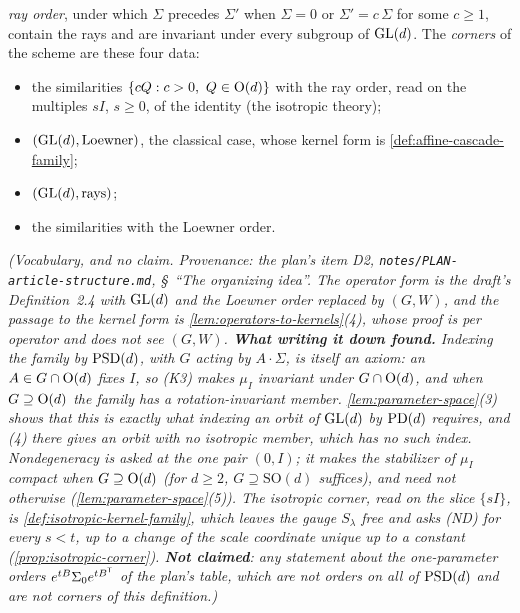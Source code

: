 \begin{definition}
\emph{ray order}, under which $\Sigma$ precedes $\Sigma'$ when $\Sigma = 0$ or $\Sigma' = c\,\Sigma$
for some $c \ge 1$, contain the rays and are invariant under every subgroup of $\mathrm{GL}(d)$. The
\emph{corners} of the scheme are these four data:
\begin{itemize}
\item the similarities $\{cQ : c > 0,\ Q \in \mathrm{O}(d)\}$ with the ray order, read on the multiples
$sI$, $s \ge 0$, of the identity (the isotropic theory);
\item $(\mathrm{GL}(d), \text{Loewner})$, the classical case, whose kernel form is
\ref{def:affine-cascade-family};
\item $(\mathrm{GL}(d), \text{rays})$;
\item the similarities with the Loewner order.
\end{itemize}
\statusT\quad\emph{(Vocabulary, and no claim. Provenance: the plan's item D2,
\texttt{notes/PLAN-article-structure.md}, \S\ ``The organizing idea''. The operator form is the
draft's Definition~2.4 with $\mathrm{GL}(d)$ and the Loewner order replaced by $(G, W)$, and the passage to
the kernel form is \ref{lem:operators-to-kernels}(4), whose proof is per operator and does not see
$(G, W)$. \textbf{What writing it down found.} Indexing the family by $\mathrm{PSD}(d)$, with $G$ acting by
$A \cdot \Sigma$, is itself an axiom: an $A \in G \cap \mathrm{O}(d)$ fixes $I$, so (K3) makes $\mu_I$
invariant under $G \cap \mathrm{O}(d)$, and when $G \supseteq \mathrm{O}(d)$ the family has a
rotation-invariant member. \ref{lem:parameter-space}(3) shows that this is exactly what indexing an
orbit of $\mathrm{GL}(d)$ by $\mathrm{PD}(d)$ requires, and (4) there gives an orbit with no isotropic member, which
has no such index. Nondegeneracy is asked at the one pair $(0, I)$; it makes the stabilizer of $\mu_I$
compact when $G \supseteq \mathrm{O}(d)$ (for $d \ge 2$, $G \supseteq \mathrm{SO}(d)$ suffices), and need not
otherwise (\ref{lem:parameter-space}(5)).
The isotropic corner, read on the slice $\{sI\}$, is \ref{def:isotropic-kernel-family}, which
leaves the gauge $S_\lambda$ free and asks (ND) for every $s < t$, up to a change of the scale
coordinate unique up to a constant (\ref{prop:isotropic-corner}). \textbf{Not claimed}: any
statement about the one-parameter orders $e^{tB}\Sigma_0e^{tB^{\mathsf{T}}}$ of the plan's table, which
are not orders on all of $\mathrm{PSD}(d)$ and are not corners of this definition.)}
\end{definition}

